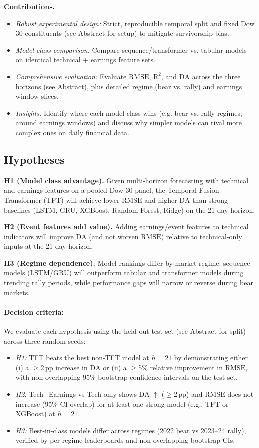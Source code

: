 \documentclass[conference,a4paper]{IEEEtran}
\newcommand{\rmse}{\ensuremath{\mathrm{RMSE}}}
\newcommand{\rTwo}{\ensuremath{\mathrm{R}^2}}
\newcommand{\da}{\ensuremath{\mathrm{DA}}}
\begin{document}
\textbf{Contributions.}
\begin{itemize}
    \item \textit{Robust experimental design:} Strict, reproducible temporal split and fixed Dow 30 constituents (see Abstract for setup) to mitigate survivorship bias.
    \item \textit{Model class comparison:} Compare sequence/transformer vs. tabular models on identical technical + earnings feature sets.
    \item \textit{Comprehensive evaluation:} Evaluate \rmse{}, \rTwo{}, and \da{} across the three horizons (see Abstract), plus detailed regime (bear vs. rally) and earnings window slices.
    \item \textit{Insights:} Identify where each model class wins (e.g. bear vs. rally regimes; around earnings windows) and discuss why simpler models can rival more complex ones on daily financial data.
\end{itemize}

\subsection{Hypotheses}

\textbf{H1 (Model class advantage).} Given multi-horizon forecasting with technical and earnings features on a pooled Dow 30 panel, the Temporal Fusion Transformer (TFT) will achieve lower \rmse{} and higher \da{} than strong baselines (LSTM, GRU, XGBoost, Random Forest, Ridge) on the 21-day horizon.

\textbf{H2 (Event features add value).} Adding earnings/event features to technical indicators will improve \da{} (and not worsen \rmse{}) relative to technical-only inputs at the 21-day horizon.

\textbf{H3 (Regime dependence).} Model rankings differ by market regime: sequence models (LSTM/GRU) will outperform tabular and transformer models during trending rally periods, while performance gaps will narrow or reverse during bear markets.

\paragraph{Decision criteria:}
We evaluate each hypothesis using the held-out test set (see Abstract for split) across three random seeds:
\begin{itemize}
        \item \textit{H1:} TFT beats the best non-TFT model at $h{=}21$ by demonstrating either (i) a $\geq$2\,pp increase in \da{} or (ii) a $\geq$5\% relative improvement in \rmse{}, with non-overlapping 95\% bootstrap confidence intervals on the test set.
    \item \textit{H2:} Tech{+}Earnings vs Tech-only shows \da{} $\uparrow$ ($\geq$2\,pp) and \rmse{} does not increase (95\% CI overlap) for at least one strong model (e.g., TFT or XGBoost) at $h{=}21$.
  \item \textit{H3:} Best-in-class models differ across regimes (2022 bear vs 2023--24 rally), verified by per-regime leaderboards and non-overlapping bootstrap CIs.
\end{itemize}
\end{document}
